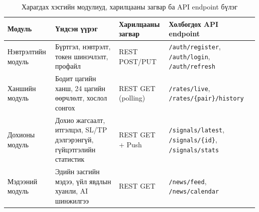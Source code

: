 \begin{table}[H]
\centering
\caption{Харагдах хэсгийн модулиуд, харилцааны загвар ба API endpoint бүлэг}
\label{tab:frontend_modules_app}
\renewcommand{\arraystretch}{1.10}
\setlength{\tabcolsep}{3pt}
\footnotesize
\begin{tabularx}{\textwidth}{|>{\raggedright\arraybackslash}p{2.4cm}|>{\raggedright\arraybackslash}p{3.0cm}|>{\centering\arraybackslash}p{2.1cm}|>{\raggedright\arraybackslash}X|}
\hline
\textbf{Модуль} & \textbf{Үндсэн үүрэг} & \textbf{Харилцааны загвар} & \textbf{Холбогдох API endpoint} \\ \hline
Нэвтрэлтийн модуль & Бүртгэл, нэвтрэлт, токен шинэчлэлт, профайл & REST POST/PUT & \texttt{/auth/register}, \texttt{/auth/login}, \texttt{/auth/refresh} \\ \hline
Ханшийн модуль & Бодит цагийн ханш, 24 цагийн өөрчлөлт, хослол сонгох & REST GET (polling) & \texttt{/rates/live}, \texttt{/rates/\{pair\}/history} \\ \hline
Дохионы модуль & Дохио жагсаалт, итгэлцэл, SL/TP дэлгэрэнгүй, гүйцэтгэлийн статистик & REST GET + Push & \texttt{/signals/latest}, \texttt{/signals/\{id\}}, \texttt{/signals/stats} \\ \hline
Мэдээний модуль & Эдийн засгийн мэдээ, үйл явдлын хуанли, AI шинжилгээ & REST GET & \texttt{/news/feed}, \texttt{/news/calendar} \\ \hline
\end{tabularx}
\end{table}
